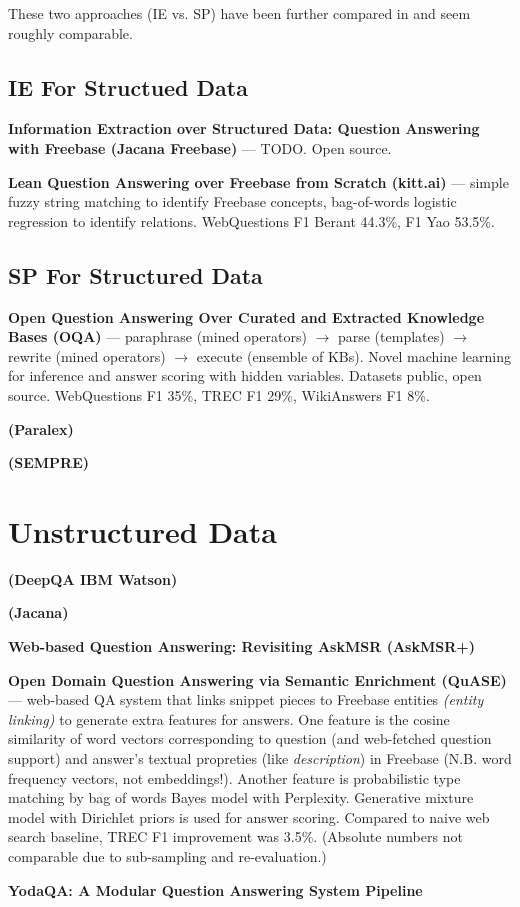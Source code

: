\documentclass[11pt,a4paper]{article}
\begin{document}
These two approaches (IE vs. SP) have been further compared in \cite{FreebaseQA2014Yao}
and seem roughly comparable.

\subsection{IE For Structued Data}

\textbf{Information Extraction over Structured Data: Question Answering with Freebase (Jacana Freebase)} \cite{TreeFreebase2014Yao}
	--- TODO.
		Open source.

\textbf{Lean Question Answering over Freebase from Scratch (kitt.ai)} \cite{LeanFreebaseYao}
	--- simple fuzzy string matching to identify Freebase concepts,
		bag-of-words logistic regression to identify relations.
		WebQuestions F1 Berant 44.3\%, F1 Yao 53.5\%.

\subsection{SP For Structured Data}

\textbf{Open Question Answering Over Curated and Extracted Knowledge Bases (OQA)} \cite{OQA}
	--- paraphrase (mined operators) $\to$ parse (templates) $\to$ rewrite (mined operators) $\to$ execute (ensemble of KBs).
	Novel machine learning for inference and answer scoring with hidden variables.
	Datasets public, open source.
	WebQuestions F1 35\%, TREC F1 29\%, WikiAnswers F1 8\%.

\textbf{(Paralex)} \cite{Fader2013Paraphrase}

\textbf{(SEMPRE)} \cite{SPBerant2014Paraphrase}

\section{Unstructured Data}

\textbf{(DeepQA IBM Watson)} \cite{WatsonOverview}

\textbf{(Jacana)} \cite{TreeEdit2013Yao} \cite{TreeEditIR2013Yao}

\textbf{Web-based Question Answering: Revisiting AskMSR (AskMSR+)}

\textbf{Open Domain Question Answering via Semantic Enrichment (QuASE)} \cite{QuASE}
	--- web-based QA system that links snippet pieces to Freebase entities
	\textit{(entity linking)} to generate extra features for answers.
	One feature is the cosine similarity of word
	vectors corresponding to question (and web-fetched question support)
	and answer's textual propreties (like \textit{description}) in Freebase
	(N.B. word frequency vectors, not embeddings!).
	Another feature is probabilistic type matching by bag of words Bayes model
	with Perplexity.  Generative mixture model with Dirichlet priors is used
	for answer scoring.  Compared to naive web search baseline, TREC F1
	improvement was 3.5\%.  (Absolute numbers not comparable due to
	sub-sampling and re-evaluation.)

\textbf{YodaQA: A Modular Question Answering System Pipeline} \cite{YodaQAPoster2015}



\end{document}
